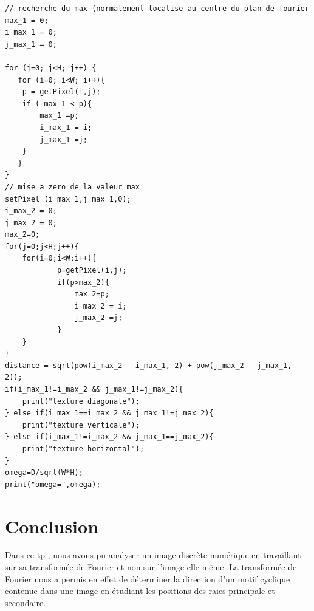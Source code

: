 \documentclass[a4paper,12pt]{report}
\begin{document}
\begin{lstlisting}[float,style=Java,caption={Code question 7},label=lst:question 7]
// recherche du max (normalement localise au centre du plan de fourier
max_1 = 0; 
i_max_1 = 0;
j_max_1 = 0;

for (j=0; j<H; j++) {
   for (i=0; i<W; i++){
	p = getPixel(i,j);
	if ( max_1 < p){
		max_1 =p;
		i_max_1 = i;
		j_max_1 =j;
	} 
   }
}
// mise a zero de la valeur max
setPixel (i_max_1,j_max_1,0);
i_max_2 = 0;
j_max_2 = 0;
max_2=0;
for(j=0;j<H;j++){
	for(i=0;i<W;i++){
			p=getPixel(i,j);
			if(p>max_2){
				max_2=p;
				i_max_2 = i;
				j_max_2 =j;
			}
	}
}
distance = sqrt(pow(i_max_2 - i_max_1, 2) + pow(j_max_2 - j_max_1, 2));
if(i_max_1!=i_max_2 && j_max_1!=j_max_2){
	print("texture diagonale");
} else if(i_max_1==i_max_2 && j_max_1!=j_max_2){
	print("texture verticale");
} else if(i_max_1!=i_max_2 && j_max_1==j_max_2){
	print("texture horizontal");
}
omega=D/sqrt(W*H);
print("omega=",omega);
\end{lstlisting}




\newpage
\section*{Conclusion}
Dans ce tp , nous avons pu analyser un image discrète numérique en travaillant sur sa transformée de Fourier et non sur l'image elle même. La transformée de Fourier nous a permis en effet de déterminer la direction d'un motif cyclique contenue dans une image en étudiant les positions des raies principale et secondaire.   
\end{document}
